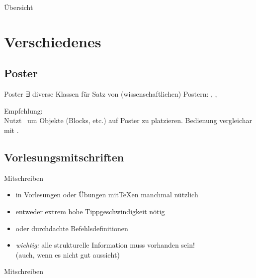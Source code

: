 \documentclass[
	vorläufig=true,
	datum=2017-01-26,
	titel={Komplexe Makros und Befehle},
	web=true,
	max,
]{../tex/latexkurs-slides}
\begin{document}
\begin{frame}{Übersicht}
	\tableofcontents
\end{frame}


\section{Verschiedenes}
\subsection{Poster}
\begin{frame}{Poster}
%
∃ diverse Klassen für Satz von (wissenschaftlichen) Postern: , , \\[1ex]\pause

Empfehlung: \\[1ex]

Nutzt	 \TikZ\ um Objekte (Blocks, etc.) auf Poster zu platzieren. Bedienung vergleichar mit .
\end{frame}

\subsection{Vorlesungsmitschriften}

\begin{frame}{Mitschreiben}
\begin{itemize}
	\item in Vorlesungen oder Übungen mit\TeX{}en manchmal nützlich
	\item entweder extrem hohe Tippgeschwindigkeit nötig
	\item oder durchdachte Befehlsdefinitionen
	\item \emph{wichtig:} alle strukturelle Information muss vorhanden sein!\\%
(auch, wenn es nicht gut aussieht)
\end{itemize} 
\end{frame}

\begin{frame}[fragile]{Mitschreiben}
\end{frame}
\end{document}
